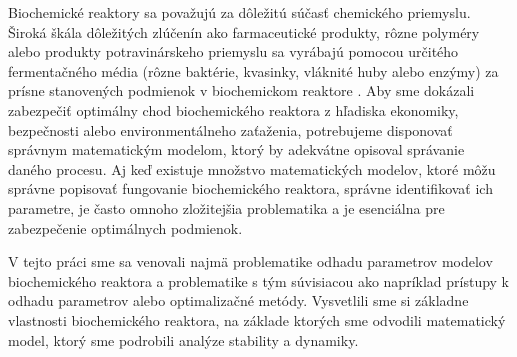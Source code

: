 Biochemické reaktory sa považujú za dôležitú súčasť chemického priemyslu. Široká škála dôležitých zlúčenín ako farmaceutické produkty, rôzne polyméry alebo produkty potravinárskeho priemyslu sa vyrábajú pomocou určitého fermentačného média (rôzne baktérie, kvasinky, vláknité huby alebo enzýmy) za prísne stanovených podmienok v biochemickom reaktore \cite{SRINIVASAN20031}. Aby sme dokázali zabezpečiť optimálny chod biochemického reaktora z hľadiska ekonomiky, bezpečnosti alebo environmentálneho zaťaženia, potrebujeme disponovať správnym matematickým modelom, ktorý by adekvátne opisoval správanie daného procesu. Aj keď existuje množstvo matematických modelov, ktoré môžu správne popisovať fungovanie biochemického reaktora, správne identifikovať ich parametre, je často omnoho zložitejšia problematika a je esenciálna pre zabezpečenie optimálnych podmienok.

V tejto práci sme sa venovali najmä problematike odhadu parametrov modelov biochemického reaktora a problematike s tým súvisiacou ako napríklad prístupy k odhadu parametrov alebo optimalizačné metódy. Vysvetlili sme si základne vlastnosti biochemického reaktora, na základe ktorých sme odvodili matematický model, ktorý sme podrobili analýze stability a dynamiky.

